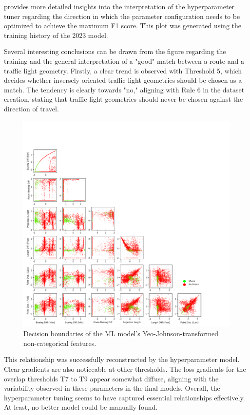  provides more detailed insights into the interpretation of the hyperparameter tuner regarding the direction in which the parameter configuration needs to be optimized to achieve the maximum F1 score. This plot was generated using the training history of the 2023 model.

Several interesting conclusions can be drawn from the figure regarding the training and the general interpretation of a "good" match between a route and a traffic light geometry. Firstly, a clear trend is observed with Threshold 5, which decides whether inversely oriented traffic light geometries should be chosen as a match. The tendency is clearly towards "no," aligning with Rule 6 in the dataset creation, stating that traffic light geometries should never be chosen against the direction of travel. 

\begin{figure}[H]
\centering 
\includegraphics[width=\linewidth,bb=0 0 760 760]{images/decision-boundaries.pdf}
\caption{Decision boundaries of the ML model's Yeo-Johnson-transformed non-categorical features.}
\label{fig:ml-model-decision-boundaries}
\end{figure}

This relationship was successfully reconstructed by the hyperparameter model. Clear gradients are also noticeable at other thresholds. The loss gradients for the overlap thresholds T7 to T9 appear somewhat diffuse, aligning with the variability observed in these parameters in the final models. Overall, the hyperparameter tuning seems to have captured essential relationships effectively. At least, no better model could be manually found.

